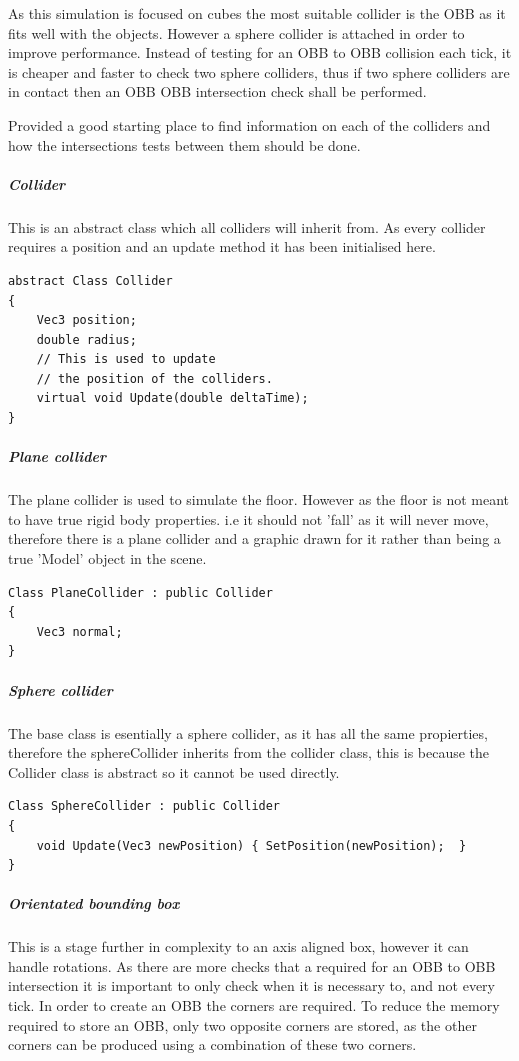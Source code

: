 \documentclass[conference,backref=page]{acmsiggraph}
\begin{document}
As this simulation is focused on cubes the most suitable collider is the OBB as it fits well with the objects. However a sphere collider is attached in order to improve performance. Instead of testing for an OBB to OBB collision each tick, it is cheaper and faster to check two sphere colliders, thus if two sphere colliders are in contact then an OBB OBB intersection check shall be performed. 


\cite{BoundingVolume} Provided a good starting place to find information on each of the colliders and how the intersections tests between them should be done.

\subparagraph{Collider} \hfill

This is an abstract class which all colliders will inherit from. As every collider requires a position and an update method it has been initialised here.

\begin{lstlisting}
abstract Class Collider
{
	Vec3 position;
	double radius;
	// This is used to update
	// the position of the colliders.
	virtual void Update(double deltaTime); 
}
\end{lstlisting}

\subparagraph{Plane collider} \hfill

The plane collider is used to simulate the floor. However as the floor is not meant to have true rigid body properties. i.e it should not 'fall' as it will never move, therefore there is a plane collider and a graphic drawn for it rather than being a true 'Model' object in the scene.

\begin{lstlisting}
Class PlaneCollider : public Collider
{
	Vec3 normal;
}
\end{lstlisting}

\subparagraph{Sphere collider}  \hfill 

The base class is esentially a sphere collider, as it has all the same propierties, therefore the sphereCollider inherits from the collider class, this is because the Collider class is abstract so it cannot be used directly.
\begin{lstlisting}
Class SphereCollider : public Collider
{
	void Update(Vec3 newPosition) { SetPosition(newPosition);  }
}
\end{lstlisting}

\subparagraph{Orientated bounding box}\hfill 

This is a stage further in complexity to an axis aligned box, however it can handle rotations. As there are more checks that a required for an OBB to OBB intersection it is important to only check when it is necessary to, and not every tick. In order to create an OBB the corners are required. To reduce the memory required to store an OBB, only two opposite corners are stored, as the other corners can be produced using a combination of these two corners.
\end{document}
